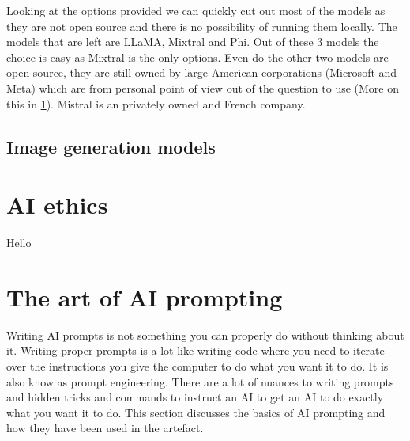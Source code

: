 Looking at the options provided we can quickly cut out most of the models as they are not open source and there is no possibility of running them locally. The models that are left are LLaMA, Mixtral and Phi. Out of these 3 models the choice is easy as Mixtral is the only options. Even do the other two models are open source, they are still owned by large American corporations (Microsoft and Meta) which are from personal point of view out of the question to use (More on this in \ref{AIethics}). Mistral is an privately owned and French company.

\subsection{Image generation models} 

\cite{bie2024renaissance}


\section{AI ethics} \label{AIethics}
Hello

\section{The art of AI prompting}
Writing AI prompts is not something you can properly do without thinking about it. Writing proper prompts is a lot like writing code where you need to iterate over the instructions you give the computer to do what you want it to do. It is also know as prompt engineering. There are a lot of nuances to writing prompts and hidden tricks and commands to instruct an AI to get an AI to do exactly what you want it to do. This section discusses the basics of AI prompting and how they have been used in the artefact.

\cite{dang2022prompt}

